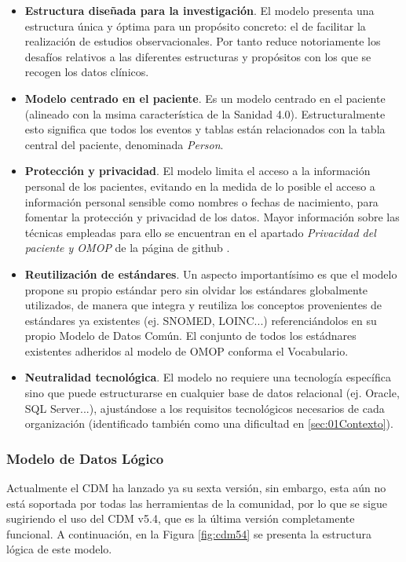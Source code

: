\begin{itemize}
    \item \textbf{Estructura diseñada para la investigación}. 
    El modelo presenta una estructura única y óptima para un propósito concreto: el de facilitar la realización de estudios observacionales. Por tanto reduce notoriamente los desafíos relativos a las diferentes estructuras y propósitos con los que se recogen los datos clínicos.
    \item \textbf{Modelo centrado en el paciente}. Es un modelo centrado en el paciente (alineado con la msima característica de la Sanidad 4.0). Estructuralmente esto significa que todos los eventos y tablas están relacionados con la tabla central del paciente, denominada \textit{Person}. 
    \item \textbf{Protección y privacidad}. El modelo limita el acceso a la información personal de los pacientes, evitando en la medida de lo posible el acceso a información personal sensible como nombres o fechas de nacimiento, para fomentar la protección y privacidad de los datos. Mayor información sobre las técnicas empleadas para ello se encuentran en el apartado \textit{Privacidad del paciente y OMOP} de la página de github \cite{gitPagesCMD}.
    \item \textbf{Reutilización de estándares}. Un aspecto importantísimo es que el modelo propone su propio estándar pero sin olvidar los estándares globalmente utilizados, de manera que integra y reutiliza los conceptos provenientes de estándares ya existentes (ej. SNOMED, LOINC...) referenciándolos en su propio Modelo de Datos Común. El conjunto de todos los estádnares existentes adheridos al modelo de OMOP conforma el Vocabulario.
    \item \textbf{Neutralidad tecnológica}. El modelo no requiere una tecnología específica sino que puede estructurarse en cualquier base de datos relacional (ej. Oracle, SQL Server...), ajustándose a los requisitos tecnológicos necesarios de cada organización (identificado también como una dificultad en \ref{sec:01Contexto}).
    
\end{itemize}

\subsubsection{Modelo de Datos Lógico}

Actualmente el CDM ha lanzado ya su sexta versión, sin embargo, esta aún no está soportada por todas las herramientas de la comunidad, por lo que se sigue sugiriendo el uso del CDM v5.4, que es la última versión completamente funcional. A continuación, en la Figura \ref{fig:cdm54} se presenta la estructura lógica de este modelo.

